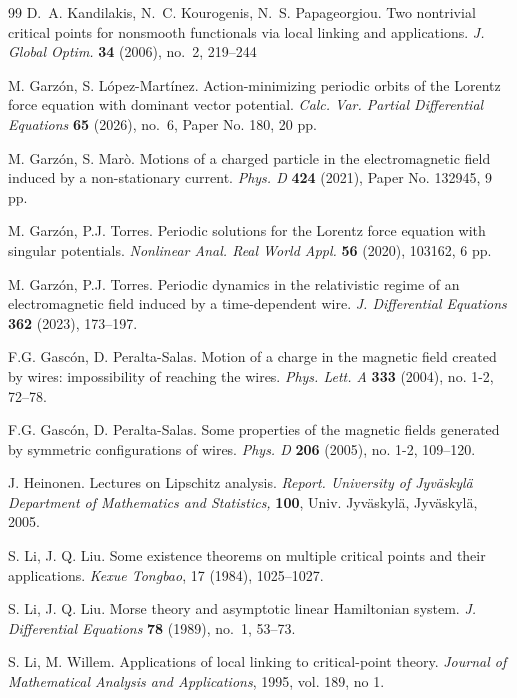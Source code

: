 \documentclass{article}
\theoremstyle{definition}
\begin{document}
\begin{thebibliography}{99}
    D.~A. Kandilakis, N.~C. Kourogenis, N.~S. Papageorgiou. Two nontrivial critical points for nonsmooth functionals via local linking and applications. \textsl{ J. Global Optim.} {\bf 34} (2006), no.~2, 219--244 
    
	 M. Garzón, S. López-Martínez. Action-minimizing periodic orbits of the Lorentz force equation with dominant vector potential. \textsl{Calc. Var. Partial Differential Equations} {\bf 65} (2026), no.~6, Paper No. 180, 20 pp.           

     M. Garz\'on, S. Marò. Motions of a charged particle in the electromagnetic field induced by a non-stationary current. \textsl{Phys. D} {\bf 424} (2021), Paper No. 132945, 9 pp.
			
	 M. Garz\'on, P.J. Torres. Periodic solutions for the Lorentz force equation with singular potentials. \textsl{Nonlinear Anal. Real World Appl.} {\bf 56} (2020), 103162, 6 pp.
			
	 M. Garz\'on, P.J. Torres. Periodic dynamics in the relativistic regime of an electromagnetic field induced by a time-dependent wire. \textsl{J. Differential Equations} {\bf 362} (2023), 173--197.
			
	 F.G. Gasc\'on, D. Peralta-Salas. Motion of a charge in the magnetic field created by wires: impossibility of reaching the wires. \textsl{Phys. Lett. A} {\bf 333} (2004), no. 1-2, 72--78.
			
	 F.G. Gasc\'on, D. Peralta-Salas. Some properties of the magnetic fields generated by symmetric configurations of wires. \textsl{Phys. D} {\bf 206} (2005), no. 1-2, 109--120.
	
     J. Heinonen.  Lectures on Lipschitz analysis. \textsl{Report. University of Jyv\"askyl\"a{} Department of Mathematics and Statistics,} {\bf 100}, Univ. Jyv\"askyl\"a, Jyv\"askyl\"a, 2005.

     S. Li, J. Q. Liu. Some existence theorems on multiple critical points and their applications. \textsl{Kexue Tongbao}, 17 (1984), 1025–1027.
    
     S. Li, J. Q. Liu. Morse theory and asymptotic linear Hamiltonian system. \textsl{ J. Differential Equations} {\bf 78} (1989), no.~1, 53--73.

     S. Li, M. Willem. Applications of local linking to critical-point theory. \textsl{ Journal of Mathematical Analysis and Applications}, 1995, vol. 189, no 1.


\end{thebibliography}
\end{document}
